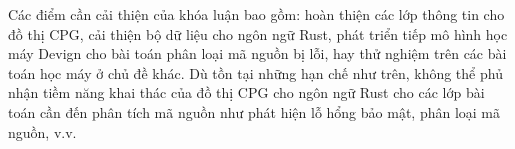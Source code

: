 Các điểm cần cải thiện của khóa luận bao gồm: hoàn thiện các lớp thông tin cho đồ thị CPG, cải thiện bộ dữ liệu cho ngôn ngữ Rust, phát triển tiếp mô hình học máy Devign cho bài toán phân loại mã nguồn bị lỗi, hay thử nghiệm trên các bài toán học máy ở chủ đề khác.
Dù tồn tại những hạn chế như trên, không thể phủ nhận tiềm năng khai thác của đồ thị CPG cho ngôn ngữ Rust cho các lớp bài toán cần đến phân tích mã nguồn như phát hiện lỗ hổng bảo mật, phân loại mã nguồn, v.v.